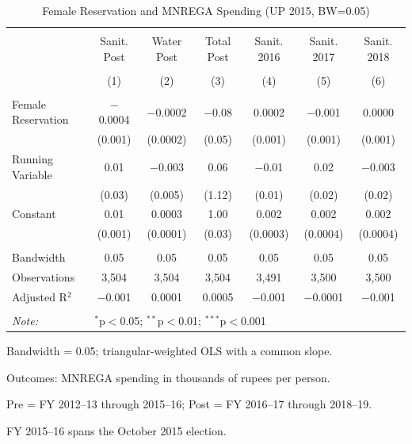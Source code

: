 \begin{table}
\centering
\begin{threeparttable}

  \caption{Female Reservation and MNREGA Spending (UP 2015, BW=0.05)} 
  \label{tab:mnrega_up_cdm_bw05} 
\scriptsize 
\begin{tabular}{@{\extracolsep{0pt}}lcccccc} 
\\[-1.8ex]\hline 
\hline \\[-1.8ex] 
 & Sanit. Post & Water Post & Total Post & Sanit. 2016 & Sanit. 2017 & Sanit. 2018 \\ 
\\[-1.8ex] & (1) & (2) & (3) & (4) & (5) & (6)\\ 
\hline \\[-1.8ex] 
 Female Reservation & $-$0.0004 & $-$0.0002 & $-$0.08 & 0.0002 & $-$0.001 & 0.0000 \\ 
  & (0.001) & (0.0002) & (0.05) & (0.001) & (0.001) & (0.001) \\ 
  Running Variable & 0.01 & $-$0.003 & 0.06 & $-$0.01 & 0.02 & $-$0.003 \\ 
  & (0.03) & (0.005) & (1.12) & (0.01) & (0.02) & (0.02) \\ 
  Constant & 0.01 & 0.0003 & 1.00 & 0.002 & 0.002 & 0.002 \\ 
  & (0.001) & (0.0001) & (0.03) & (0.0003) & (0.0004) & (0.0004) \\ 
 \hline \\[-1.8ex] 
Bandwidth & 0.05 & 0.05 & 0.05 & 0.05 & 0.05 & 0.05 \\ 
Observations & 3,504 & 3,504 & 3,504 & 3,491 & 3,500 & 3,500 \\ 
Adjusted R$^{2}$ & $-$0.001 & 0.0001 & 0.0005 & $-$0.001 & $-$0.0001 & $-$0.001 \\ 
\hline 
\hline \\[-1.8ex] 
\textit{Note:}  & \multicolumn{6}{l}{$^{*}$p$<$0.05; $^{**}$p$<$0.01; $^{***}$p$<$0.001} \\ 
\end{tabular} 
\begin{tablenotes}[flushleft]
\setlength{\itemindent}{0em}
\scriptsize
\item[] Bandwidth = 0.05; triangular-weighted OLS with a common slope.
\item[] Outcomes: MNREGA spending in thousands of rupees per person.
\item[] Pre = FY 2012--13 through 2015--16; Post = FY 2016--17 through 2018--19.
\item[] FY 2015--16 spans the October 2015 election.

\end{tablenotes}
\end{threeparttable}
\end{table}
